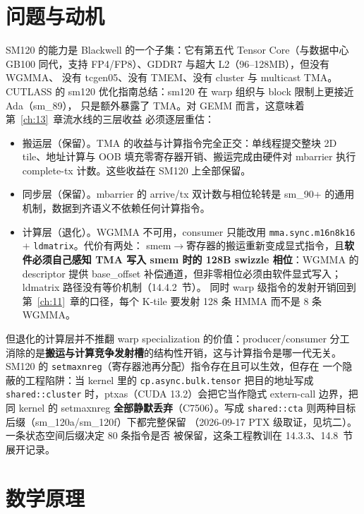 \section{问题与动机}

SM120 的能力是 Blackwell 的一个子集：它有第五代 Tensor Core（与数据中心
GB100 同代，支持 FP4/FP8）、GDDR7 与超大 L2（96--128MB），但没有 WGMMA、
没有 tcgen05、没有 TMEM、没有 cluster 与 multicast TMA。CUTLASS 的
sm120 优化指南总结：sm120 在 warp 组织与 block 限制上更接近 Ada（sm\_89），
只是额外暴露了 TMA。对 GEMM 而言，这意味着第~\ref{ch:13}~章流水线的三层收益
必须逐层重估：

\begin{itemize}
  \item 搬运层（保留）。TMA 的收益与计算指令完全正交：单线程提交整块
        2D tile、地址计算与 OOB 填充零寄存器开销、搬运完成由硬件对 mbarrier
        执行 complete-tx 计数。这些收益在 SM120 上全部保留。
  \item 同步层（保留）。mbarrier 的 arrive/tx 双计数与相位轮转是
        sm\_90+ 的通用机制，数据到齐语义不依赖任何计算指令。
  \item 计算层（退化）。WGMMA 不可用，consumer 只能改用
        \texttt{mma.\allowbreak{}sync.\allowbreak{}m16n8k16} + \texttt{ldmatrix}。代价有两处：
        smem$\to$寄存器的搬运重新变成显式指令，且\textbf{软件必须自己感知 TMA
        写入 smem 时的 128B swizzle 相位}：WGMMA 的 descriptor 提供
        base\_offset 补偿通道，但非零相位必须由软件显式写入；ldmatrix 路径没有等价机制（14.4.2~节）。
        同时 warp 级指令的发射开销回到第~\ref{ch:11}~章的口径，每个
        K-tile 要发射 128 条 HMMA 而不是 8 条 WGMMA。
\end{itemize}

但退化的计算层并不推翻 warp specialization 的价值：producer/consumer 分工
消除的是\textbf{搬运与计算竞争发射槽}的结构性开销，这与计算指令是哪一代无关。
SM120 的 \texttt{setmaxnreg}（寄存器池再分配）指令存在且可以生效，但存在
一个隐蔽的工程陷阱：当 kernel 里的
\texttt{cp.\allowbreak{}async.\allowbreak{}bulk.\allowbreak{}tensor} 把目的地址写成
\texttt{shared::cluster} 时，ptxas（CUDA 13.2）会把它当作隐式 extern-call
边界，把同 kernel 的 setmaxnreg \textbf{全部静默丢弃}（C7506）。写成
\texttt{shared::cta} 则两种目标后缀（sm\_120a/sm\_120f）下都完整保留
（2026-09-17 PTX 级取证，见坑二）。一条状态空间后缀决定 80 条指令是否
被保留，这条工程教训在 14.3.3、14.8~节展开记录。

\section{数学原理}

